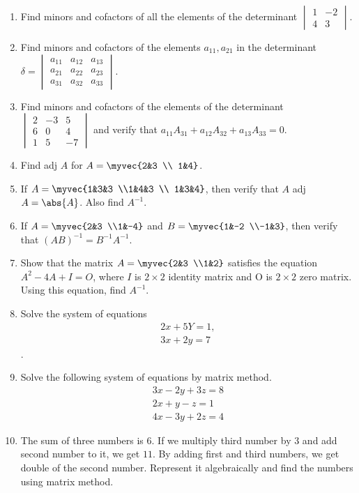 \begin{enumerate}
\item Find minors and cofactors of all the elements of the determinant $\begin{vmatrix} 1&-2 \\ 4&3 \end{vmatrix}$.
\item Find minors and cofactors of the elements $a_{11}, a_{21}$ in the determinant $\delta= \begin{vmatrix} a_{11}&a_{12}&a_{13} \\a_{21}&a_{22}&a_{23} \\a_{31}&a_{32}&a_{33} \end{vmatrix}$.
\item Find minors and cofactors of the elements of the determinant $\begin{vmatrix} 2&-3&5 \\6&0&4 \\1&5&-7 \end{vmatrix}$ and verify that $a_{11}A_{31} + a_{12}A_{32} + a_{13}A_{33} = 0$.
\item Find adj $A$ for $A=\myvec{2&3 \\ 1&4}$.
\item If $A=\myvec{1&3&3 \\1&4&3 \\ 1&3&4}$, then verify that $A$ adj $A = \abs{A}$. Also find $A^{-1}$.
\item If $A=\myvec{2&3 \\1&-4}$ and $B=\myvec{1&-2 \\-1&3}$, then verify that $(AB)^{-1} = B^{-1}A^{-1}$.
\item Show that the matrix $A=\myvec{2&3 \\1&2}$ satisfies the equation $A^2-4A+I=O$, where $I$ is $2\times 2$ identity matrix and O is $2\times 2$ zero matrix. Using this equation, find $A^{-1}$.
\item Solve the system of equations
 \begin{align}2x+5Y=1,\\ 3x+2y=7\end{align}.
\item Solve the following system of equations by matrix method.
\begin{align}
3x-2y+3z=8\\ 2x+y-z=1\\ 4x-3y+2z=4
\end{align}
\item The sum of three numbers is $6$. If we multiply third number by $3$ and add second number to it, we get $11$. By adding first and third numbers, we get double of the second number. Represent it algebraically and find the numbers using matrix method.

\end{enumerate}
